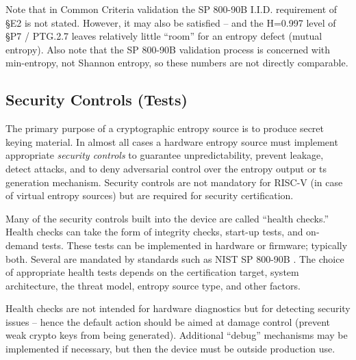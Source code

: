     Note that in Common Criteria validation the SP 800-90B I.I.D. requirement
    of \S E2 is not stated. However, it may also be satisfied -- and the
    H=0.997 level of \S P7 / PTG.2.7 leaves relatively little ``room'' for an
    entropy defect (mutual entropy).
    Also note that the SP 800-90B validation process is concerned with
    min-entropy, not Shannon entropy, so these numbers are not directly
    comparable.


\subsection{Security Controls (Tests)}
\label{sec:security-controls}

    The primary purpose of a cryptographic entropy source is to produce
    secret keying material. In almost all cases a hardware entropy source
    must implement appropriate \emph{security controls} to guarantee
    unpredictability, prevent leakage, detect attacks, and to deny
    adversarial control over the entropy output or ts generation mechanism.
    Security controls are not mandatory for RISC-V (in case of virtual
    entropy sources) but are required for security certification.

    Many of the security controls built into the device are called ``health
    checks.'' Health checks can take the form of integrity checks, start-up
    tests, and on-demand tests. These tests can be implemented in hardware
    or firmware; typically both. Several are mandated by standards such as
    NIST SP 800-90B \cite{NI19}. The choice of appropriate health tests
    depends on the certification target, system architecture, the threat
    model, entropy source type, and other factors.

    Health checks are not intended for hardware diagnostics but for
    detecting security issues -- hence the default action should be aimed
    at damage control (prevent weak crypto keys from being
    generated). Additional ``debug'' mechanisms may be implemented if
    necessary, but then the device must be outside production use.

